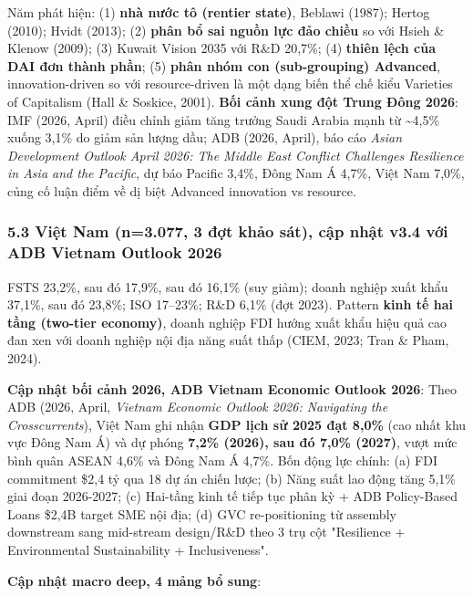 \documentclass[12pt,a4paper]{article}
\begin{document}
Năm phát hiện: (1) \textbf{nhà nước tô (rentier state)}, Beblawi (1987);
Hertog (2010); Hvidt (2013); (2) \textbf{phân bổ sai nguồn lực đảo
chiều} so với Hsieh \& Klenow (2009); (3) Kuwait Vision 2035 với R\&D
20,7\%; (4) \textbf{thiên lệch của DAI đơn thành phần}; (5) \textbf{phân
nhóm con (sub-grouping) Advanced}, innovation-driven so với
resource-driven là một dạng biến thể chế kiểu Varieties of Capitalism
(Hall \& Soskice, 2001). \textbf{Bối cảnh xung đột Trung Đông 2026}: IMF
(2026, April) điều chỉnh giảm tăng trưởng Saudi Arabia mạnh từ
\textasciitilde4,5\% xuống 3,1\% do giảm sản lượng dầu; ADB (2026,
April), báo cáo \emph{Asian Development Outlook April 2026: The Middle
East Conflict Challenges Resilience in Asia and the Pacific}, dự báo
Pacific 3,4\%, Đông Nam Á 4,7\%, Việt Nam 7,0\%, củng cố luận điểm về dị
biệt Advanced innovation vs resource.

\hypertarget{53-viux1ec7t-nam-n3077-3-ux111ux1ee3t-khux1ea3o-suxe1t-cux1eadp-nhux1eadt-v34-vux1edbi-adb-vietnam-outlook-2026}{%
\subsubsection{5.3 Việt Nam (n=3.077, 3 đợt khảo sát), cập nhật v3.4 với
ADB Vietnam Outlook
2026}\label{53-viux1ec7t-nam-n3077-3-ux111ux1ee3t-khux1ea3o-suxe1t-cux1eadp-nhux1eadt-v34-vux1edbi-adb-vietnam-outlook-2026}}

FSTS 23,2\%, sau đó 17,9\%, sau đó 16,1\% (suy giảm); doanh nghiệp xuất
khẩu 37,1\%, sau đó 23,8\%; ISO 17--23\%; R\&D 6,1\% (đợt 2023). Pattern
\textbf{kinh tế hai tầng (two-tier economy)}, doanh nghiệp FDI hướng
xuất khẩu hiệu quả cao đan xen với doanh nghiệp nội địa năng suất thấp
(CIEM, 2023; Tran \& Pham, 2024).

\textbf{Cập nhật bối cảnh 2026, ADB Vietnam Economic Outlook 2026}: Theo
ADB (2026, April, \emph{Vietnam Economic Outlook 2026: Navigating the
Crosscurrents}), Việt Nam ghi nhận \textbf{GDP lịch sử 2025 đạt 8,0\%}
(cao nhất khu vực Đông Nam Á) và dự phóng \textbf{7,2\% (2026), sau đó
7,0\% (2027)}, vượt mức bình quân ASEAN 4,6\% và Đông Nam Á 4,7\%. Bốn
động lực chính: (a) FDI commitment \$2,4 tỷ qua 18 dự án chiến lược; (b)
Năng suất lao động tăng 5,1\% giai đoạn 2026-2027; (c) Hai-tầng kinh tế
tiếp tục phân kỳ + ADB Policy-Based Loans \$2,4B target SME nội địa; (d)
GVC re-positioning từ assembly downstream sang mid-stream design/R\&D
theo 3 trụ cột "Resilience + Environmental Sustainability +
Inclusiveness".

\textbf{Cập nhật macro deep, 4 mảng bổ sung}:
\end{document}

